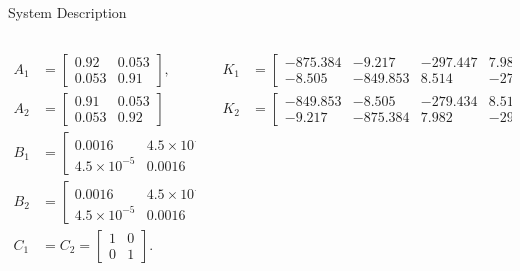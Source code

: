 \begin{slide}{System Description}
  \vspace*{\fill}
  \begin{columns}[T]
    \begin{column}{0.38\textwidth}
      \begin{equation}
        \begin{aligned}
          A_1 & =
          \begin{bmatrix}
            0.92  & 0.053 \\
            0.053 & 0.91
          \end{bmatrix},          \\
          A_2 & = \begin{bmatrix}
            0.91  & 0.053 \\
            0.053 & 0.92
          \end{bmatrix}   \\
          B_1 & =
          \begin{bmatrix}
            0.0016           & 4.5\times10^{-5} \\
            4.5\times10^{-5} & 0.0016
          \end{bmatrix},          \\
          B_2 & = \begin{bmatrix}
            0.0016           & 4.5\times10^{-5} \\
            4.5\times10^{-5} & 0.0016
          \end{bmatrix}, \\
          C_1 & = C_2 =
          \begin{bmatrix}
            1 & 0 \\
            0 & 1
          \end{bmatrix}.
        \end{aligned}
      \end{equation}
    \end{column}
    \hfill%
    \begin{column}{0.58\textwidth}
      \begin{equation}
        \begin{aligned}
          K_1 & = \begin{bmatrix}
            -875.384 & -9.217   & -297.447 & 7.982    \\
            -8.505   & -849.853 & 8.514    & -279.434
          \end{bmatrix}, \\
          K_2 & = \begin{bmatrix}
            -849.853 & -8.505   & -279.434 & 8.514    \\
            -9.217   & -875.384 & 7.982    & -297.447
          \end{bmatrix}.
        \end{aligned}
      \end{equation}
    \end{column}%
  \end{columns}
  \vspace*{\fill}
\end{slide}


